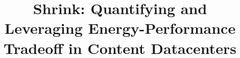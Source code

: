 \documentclass{sig-alternate-10pt}
\newcommand{\shrink}{Shrink}
\begin{document}
\title{\shrink: Quantifying and Leveraging Energy-Performance Tradeoff in Content Datacenters}



\maketitle












\vfill\eject

 
\end{document}
